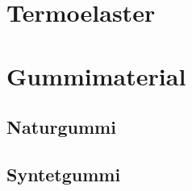 

\section{Termoelaster}

\section{Gummimaterial}
\subsection{Naturgummi}

\subsection{Syntetgummi}
